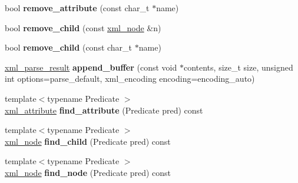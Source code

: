 \begin{DoxyCompactItemize}
\item 
\hypertarget{classpugi_1_1xml__node_a2625858b335a1289d72d19b57acc639c}{}bool {\bfseries remove\+\_\+attribute} (const char\+\_\+t $\ast$name)\label{classpugi_1_1xml__node_a2625858b335a1289d72d19b57acc639c}

\item 
\hypertarget{classpugi_1_1xml__node_a4b562d01edab7dad880e9e297203843d}{}bool {\bfseries remove\+\_\+child} (const \hyperlink{classpugi_1_1xml__node}{xml\+\_\+node} \&n)\label{classpugi_1_1xml__node_a4b562d01edab7dad880e9e297203843d}

\item 
\hypertarget{classpugi_1_1xml__node_a1930157197e41cc15eea1fc00eecf1dd}{}bool {\bfseries remove\+\_\+child} (const char\+\_\+t $\ast$name)\label{classpugi_1_1xml__node_a1930157197e41cc15eea1fc00eecf1dd}

\item 
\hypertarget{classpugi_1_1xml__node_a7e0126c503dcfba5111121ec4a94c11e}{}\hyperlink{structpugi_1_1xml__parse__result}{xml\+\_\+parse\+\_\+result} {\bfseries append\+\_\+buffer} (const void $\ast$contents, size\+\_\+t size, unsigned int options=parse\+\_\+default, xml\+\_\+encoding encoding=encoding\+\_\+auto)\label{classpugi_1_1xml__node_a7e0126c503dcfba5111121ec4a94c11e}

\item 
\hypertarget{classpugi_1_1xml__node_a4e0125eb6c0857df370119df923096ea}{}{\footnotesize template$<$typename Predicate $>$ }\\\hyperlink{classpugi_1_1xml__attribute}{xml\+\_\+attribute} {\bfseries find\+\_\+attribute} (Predicate pred) const \label{classpugi_1_1xml__node_a4e0125eb6c0857df370119df923096ea}

\item 
\hypertarget{classpugi_1_1xml__node_a25b60f2847c1937f0d4dbd4828bdcd7d}{}{\footnotesize template$<$typename Predicate $>$ }\\\hyperlink{classpugi_1_1xml__node}{xml\+\_\+node} {\bfseries find\+\_\+child} (Predicate pred) const \label{classpugi_1_1xml__node_a25b60f2847c1937f0d4dbd4828bdcd7d}

\item 
\hypertarget{classpugi_1_1xml__node_a28ccb61937080e9cefe991a0c6837be6}{}{\footnotesize template$<$typename Predicate $>$ }\\\hyperlink{classpugi_1_1xml__node}{xml\+\_\+node} {\bfseries find\+\_\+node} (Predicate pred) const \label{classpugi_1_1xml__node_a28ccb61937080e9cefe991a0c6837be6}


\end{DoxyCompactItemize}
